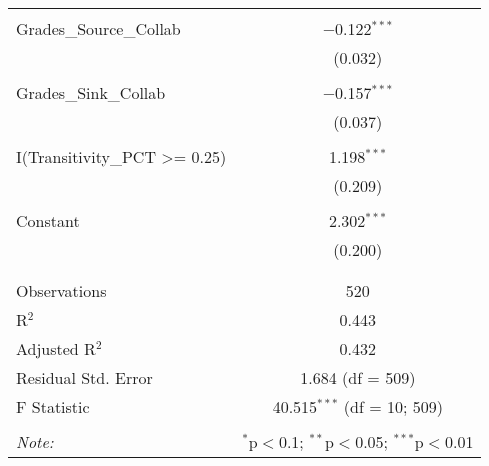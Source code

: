 \documentclass[a4paper]{article}
\begin{document}
\begin{table}[!htbp]
\begin{tabular}{@{\extracolsep{5pt}}lc}
  & \\ 
 Grades\_Source\_Collab & $-$0.122$^{***}$ \\ 
  & (0.032) \\ 
  & \\ 
 Grades\_Sink\_Collab & $-$0.157$^{***}$ \\ 
  & (0.037) \\ 
  & \\ 
 I(Transitivity\_PCT \textgreater = 0.25) & 1.198$^{***}$ \\ 
  & (0.209) \\ 
  & \\ 
 Constant & 2.302$^{***}$ \\ 
  & (0.200) \\ 
  & \\ 
\hline \\[-1.8ex] 
Observations & 520 \\ 
R$^{2}$ & 0.443 \\ 
Adjusted R$^{2}$ & 0.432 \\ 
Residual Std. Error & 1.684 (df = 509) \\ 
F Statistic & 40.515$^{***}$ (df = 10; 509) \\ 
\hline 
\hline \\[-1.8ex] 
\textit{Note:}  & \multicolumn{1}{r}{$^{*}$p$<$0.1; $^{**}$p$<$0.05; $^{***}$p$<$0.01} \\ 
\end{tabular} 
\end{table} 
\end{document}
